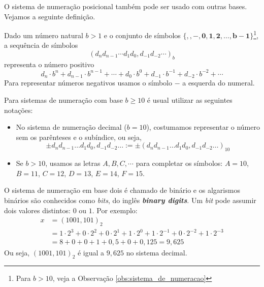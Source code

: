 O sistema de numeração posicional também pode ser usado com outras bases. Vejamos a seguinte definição.

\begin{defn}\label{def:sistema_de_numeracao}
Dado um número natural $b>1$ e o conjunto de símbolos $\{\pmb{,}, \pmb{-},  \pmb{0}, \pmb{1}, \pmb{2},\dotsc, \pmb{b-1}\}$\footnote{Para $b>10$, veja a Observação \ref{obs:sistema_de_numeracao}}, a sequência de símbolos
\begin{equation*}
  \left(d_nd_{n-1} \cdots d_1d_0,d_{-1}d_{-2} \cdots \right)_b  
\end{equation*}
representa o número positivo
\begin{equation*}
  d_n\cdot b^n + d_{n-1}\cdot b^{n-1} + \cdots + d_0\cdot b^0 + d_{-1}\cdot b^{-1}+d_{-2}\cdot b^{-2} + \cdots
\end{equation*}
Para representar números negativos usamos o símbolo $-$ a esquerda do numeral.
\end{defn}

\begin{obs}[$b\geq 10$]\label{obs:sistema_de_numeracao}
Para sistemas de numeração com base $b \geq 10$ é usual utilizar as seguintes notações:
\begin{itemize}
\item No sistema de numeração decimal ($b=10$), costumamos representar o número sem os parênteses e o subíndice, ou seja,
\begin{equation*}
  \pm d_nd_{n-1}\ldots d_1d_0,d_{-1}d_{-2}\ldots := \pm (d_nd_{n-1}\ldots d_1d_0,d_{-1}d_{-2}\ldots)_{10}  
\end{equation*}
\item Se $b>10$, usamos as letras $A, B, C, \cdots$ para completar os símbolos: $A=10$, $B=11$, $C=12$, $D=13$, $E=14$, $F=15$.
\end{itemize}
\end{obs}


\begin{ex} O sistema de numeração em base dois é chamado de binário e os algarismos binários são conhecidos como \textit{bits}, do inglês \textit{\bf{b}inary dig\bf{its}}. Um \textit{bit} pode assumir dois valores distintos: $0$ ou $1$. Por exemplo:
\begin{equation*}
  \begin{split}
    x &= (1001,101)_{2} \\
    &= 1\cdot 2^3 +0\cdot 2^2 +0\cdot 2^1 +1\cdot 2^0  +1\cdot 2^{-1} +0\cdot 2^{-2} +1\cdot 2^{-3} \\
    &= 8+0+0+1+ 0,5+0+0,125 = 9,625    
  \end{split}
\end{equation*}
Ou seja, $(1001,101)_{2}$ é igual a $9,625$ no sistema decimal.
\end{ex}


